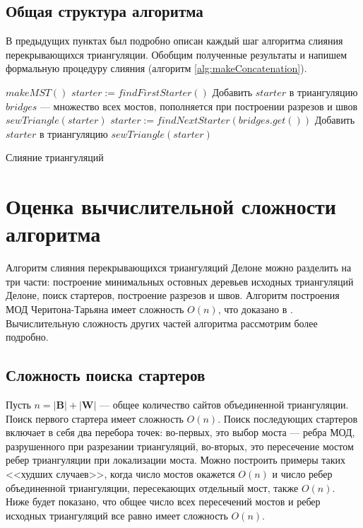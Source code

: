 \documentclass[12pt]{article}
\begin{document}
\subsection{Общая структура алгоритма}
В предыдущих пунктах был подробно описан каждый шаг алгоритма слияния перекрывающихся триангуляции.
Обобщим полученные результаты и напишем формальную процедуру слияния (алгоритм \ref{alg:makeConcatenation}).

\begin{algorithm}[htb!]
\begin{algorithmic}[1]
	\State $makeMST()$
	\State $starter := findFirstStarter()$
	\State Добавить $starter$ в триангуляцию
	\State $bridges$ --- множество всех мостов, пополняется при построении разрезов и швов
	\State $sewTriangle(starter)$
		\State $starter := findNextStarter(bridges.get())$
		\State Добавить $starter$ в триангуляцию
		\State $sewTriangle(starter)$
	\EndWhile
\EndProcedure
\end{algorithmic}
\caption{Слияние триангуляций}
\label{alg:makeConcatenation}
\end{algorithm}

\section{Оценка вычислительной сложности алгоритма}
Алгоритм слияния перекрывающихся триангуляций Делоне можно разделить на три части:
построение минимальных остовных деревьев исходных триангуляций Делоне,
поиск стартеров, построение разрезов и швов.
Алгоритм построения МОД Черитона-Тарьяна имеет сложность $O(n)$, что доказано в \cite{Preparata}.
Вычислительную сложность других частей алгоритма рассмотрим более подробно.

\subsection{Сложность поиска стартеров}
Пусть $n = |\textbf{B}| + |\textbf{W}|$ --- общее количество сайтов объединенной триангуляции.
Поиск первого стартера имеет сложность $O(n)$.
Поиск последующих стартеров включает в себя два перебора точек:
во-первых, это выбор моста –-- ребра МОД, разрушенного при разрезании триангуляций,
во-вторых, это пересечение мостом ребер триангуляции при локализации моста.
Можно построить примеры таких <<худших случаев>>, когда число мостов окажется $O(n)$ и
число ребер объединенной триангуляции, пересекающих отдельный мост, также $O(n)$.
Ниже будет показано, что общее число всех пересечений мостов и ребер исходных триангуляций все равно имеет сложность $O(n)$.
\end{document}
